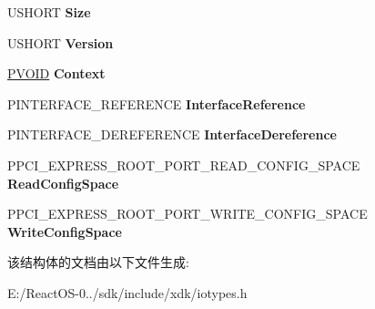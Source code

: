 \begin{DoxyCompactItemize}
\item 
\mbox{\label{struct___p_c_i___e_x_p_r_e_s_s___r_o_o_t___p_o_r_t___i_n_t_e_r_f_a_c_e_a433c11f00bbd139764ba39562502fb7c}} 
U\+S\+H\+O\+RT {\bfseries Size}
\item 
\mbox{\label{struct___p_c_i___e_x_p_r_e_s_s___r_o_o_t___p_o_r_t___i_n_t_e_r_f_a_c_e_acc71837013a38299fda5a06fa37529da}} 
U\+S\+H\+O\+RT {\bfseries Version}
\item 
\mbox{\label{struct___p_c_i___e_x_p_r_e_s_s___r_o_o_t___p_o_r_t___i_n_t_e_r_f_a_c_e_a25aaf4977cdec3936183042a5569170e}} 
\hyperlink{interfacevoid}{P\+V\+O\+ID} {\bfseries Context}
\item 
\mbox{\label{struct___p_c_i___e_x_p_r_e_s_s___r_o_o_t___p_o_r_t___i_n_t_e_r_f_a_c_e_abbb9d23cf4b6c0f7fa66359bdebf18c8}} 
P\+I\+N\+T\+E\+R\+F\+A\+C\+E\+\_\+\+R\+E\+F\+E\+R\+E\+N\+CE {\bfseries Interface\+Reference}
\item 
\mbox{\label{struct___p_c_i___e_x_p_r_e_s_s___r_o_o_t___p_o_r_t___i_n_t_e_r_f_a_c_e_a64404cb200c0fc7253770774ebb75580}} 
P\+I\+N\+T\+E\+R\+F\+A\+C\+E\+\_\+\+D\+E\+R\+E\+F\+E\+R\+E\+N\+CE {\bfseries Interface\+Dereference}
\item 
\mbox{\label{struct___p_c_i___e_x_p_r_e_s_s___r_o_o_t___p_o_r_t___i_n_t_e_r_f_a_c_e_a59d263bfa6302d1896ab630fa0ddc4dc}} 
P\+P\+C\+I\+\_\+\+E\+X\+P\+R\+E\+S\+S\+\_\+\+R\+O\+O\+T\+\_\+\+P\+O\+R\+T\+\_\+\+R\+E\+A\+D\+\_\+\+C\+O\+N\+F\+I\+G\+\_\+\+S\+P\+A\+CE {\bfseries Read\+Config\+Space}
\item 
\mbox{\label{struct___p_c_i___e_x_p_r_e_s_s___r_o_o_t___p_o_r_t___i_n_t_e_r_f_a_c_e_a94f26b822691685bfaa937588869ba4d}} 
P\+P\+C\+I\+\_\+\+E\+X\+P\+R\+E\+S\+S\+\_\+\+R\+O\+O\+T\+\_\+\+P\+O\+R\+T\+\_\+\+W\+R\+I\+T\+E\+\_\+\+C\+O\+N\+F\+I\+G\+\_\+\+S\+P\+A\+CE {\bfseries Write\+Config\+Space}
\end{DoxyCompactItemize}


该结构体的文档由以下文件生成\+:\begin{DoxyCompactItemize}
\item 
E\+:/\+React\+O\+S-\/0../sdk/include/xdk/iotypes.\+h\end{DoxyCompactItemize}
